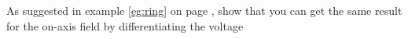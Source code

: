        As suggested in example \ref{eg:ring} on page \pageref{eg:ring},
        show that you can get the same result for the on-axis field
        by differentiating the voltage

